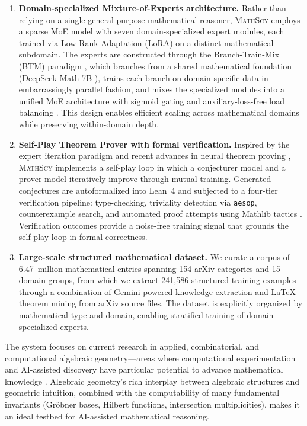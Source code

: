 \documentclass[11pt,a4paper]{article}
\newcommand{\mathscy}{\textsc{MathScy}}
\begin{document}
\begin{enumerate}[leftmargin=*]
    \item \textbf{Domain-specialized Mixture-of-Experts architecture.} Rather than relying on a single general-purpose mathematical reasoner, \mathscy{} employs a sparse MoE model with seven domain-specialized expert modules, each trained via Low-Rank Adaptation (LoRA) \citep{hu2022lora} on a distinct mathematical subdomain. The experts are constructed through the Branch-Train-Mix (BTM) paradigm \citep{sukhbaatar2024branch}, which branches from a shared mathematical foundation (DeepSeek-Math-7B \citep{shao2024deepseekmath}), trains each branch on domain-specific data in embarrassingly parallel fashion, and mixes the specialized modules into a unified MoE architecture with sigmoid gating and auxiliary-loss-free load balancing \citep{deepseekai2024deepseekv3}. This design enables efficient scaling across mathematical domains while preserving within-domain depth.

    \item \textbf{Self-Play Theorem Prover with formal verification.} Inspired by the expert iteration paradigm \citep{anthony2017thinking, silver2017mastering} and recent advances in neural theorem proving \citep{polu2023formal, xin2024deepseekproverv2}, \mathscy{} implements a self-play loop in which a conjecturer model and a prover model iteratively improve through mutual training. Generated conjectures are autoformalized into Lean~4 \citep{moura2021lean} and subjected to a four-tier verification pipeline: type-checking, triviality detection via \texttt{aesop}, counterexample search, and automated proof attempts using Mathlib tactics \citep{mathlib2020}. Verification outcomes provide a noise-free training signal that grounds the self-play loop in formal correctness.

    \item \textbf{Large-scale structured mathematical dataset.} We curate a corpus of 6.47~million mathematical entries spanning 154 arXiv categories and 15 domain groups, from which we extract 241,586 structured training examples through a combination of Gemini-powered knowledge extraction and LaTeX theorem mining from arXiv source files. The dataset is explicitly organized by mathematical type and domain, enabling stratified training of domain-specialized experts.
\end{enumerate}

The system focuses on current research in applied, combinatorial, and computational algebraic geometry---areas where computational experimentation and AI-assisted discovery have particular potential to advance mathematical knowledge \citep{cox2015ideals, garcia2024applications}. Algebraic geometry's rich interplay between algebraic structures and geometric intuition, combined with the computability of many fundamental invariants (Gr\"obner bases, Hilbert functions, intersection multiplicities), makes it an ideal testbed for AI-assisted mathematical reasoning.
\end{document}
